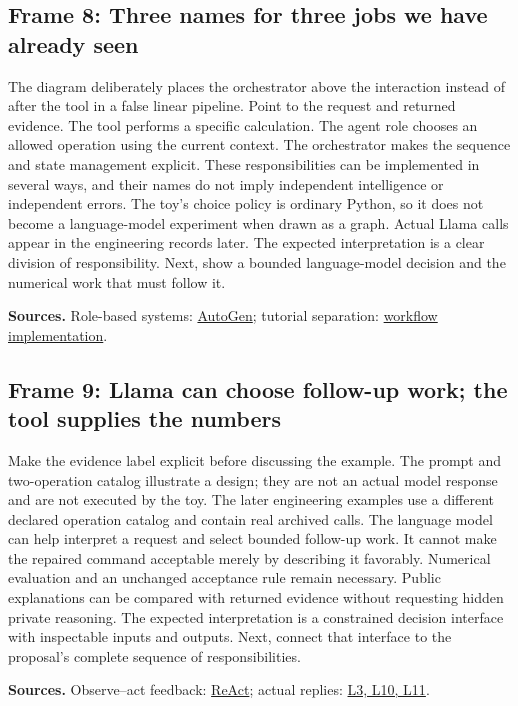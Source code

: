 \documentclass[11pt]{article}
\begin{document}
\subsection*{Frame 8: Three names for three jobs we have already seen}
The diagram deliberately places the orchestrator above the interaction instead of after the tool in a false linear pipeline. Point to the request and returned evidence. The tool performs a specific calculation. The agent role chooses an allowed operation using the current context. The orchestrator makes the sequence and state management explicit. These responsibilities can be implemented in several ways, and their names do not imply independent intelligence or independent errors. The toy's choice policy is ordinary Python, so it does not become a language-model experiment when drawn as a graph. Actual Llama calls appear in the engineering records later. The expected interpretation is a clear division of responsibility. Next, show a bounded language-model decision and the numerical work that must follow it.\par
\par\nopagebreak\begin{minipage}{\linewidth}{\footnotesize\color{slate}\textbf{Sources.} Role-based systems: \href{https://arxiv.org/abs/2308.08155}{AutoGen}; tutorial separation: \href{../src/proposal_workflow.py}{workflow implementation}.\par}\end{minipage}\par\medskip
\subsection*{Frame 9: Llama can choose follow-up work; the tool supplies the numbers}
Make the evidence label explicit before discussing the example. The prompt and two-operation catalog illustrate a design; they are not an actual model response and are not executed by the toy. The later engineering examples use a different declared operation catalog and contain real archived calls. The language model can help interpret a request and select bounded follow-up work. It cannot make the repaired command acceptable merely by describing it favorably. Numerical evaluation and an unchanged acceptance rule remain necessary. Public explanations can be compared with returned evidence without requesting hidden private reasoning. The expected interpretation is a constrained decision interface with inspectable inputs and outputs. Next, connect that interface to the proposal's complete sequence of responsibilities.\par
\par\nopagebreak\begin{minipage}{\linewidth}{\footnotesize\color{slate}\textbf{Sources.} Observe--act feedback: \href{https://arxiv.org/abs/2210.03629}{ReAct}; actual replies: \href{../Classroom_Labs.ipynb}{L3, L10, L11}.\par}\end{minipage}\par\medskip
\end{document}
